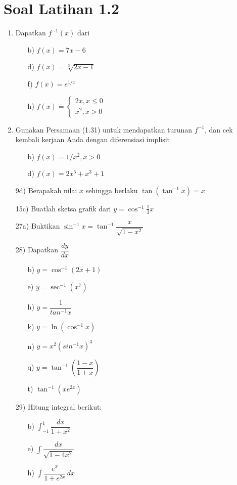 \documentclass{article}
\begin{document}
\section*{Soal Latihan 1.2}
\begin{enumerate}
	\item Dapatkan $f^{-1}(x)$ dari 
	\begin{enumerate}
		\item[b)] $f(x)=7x-6$
		\item[d)] $f(x)=\sqrt[3]{2x-1}$
		\item[f)] $f(x)=e^{1/x}$
		\item[h)] $f(x)=\begin{cases} 2x, x\leq 0\\
		x^2, x>0 \end{cases}$
	\end{enumerate}
	\item Gunakan Persamaan (1.31) untuk mendapatkan turunan $f^{-1}$, dan cek kembali kerjaan Anda dengan diferensiasi implisit
	\begin{enumerate}
		\item[b)] $f(x)=1/x^2,x>0$
		\item[d)] $f(x)=2x^5+x^3+1$
	\end{enumerate}
	\item[9d)] Berapakah nilai $x$ sehingga berlaku $\tan(\tan^{-1}x)=x$
	\item[15c)] Buatlah sketsa grafik dari $y=\cos^{-1} \frac{1}{3}x$
	\item[27a)] Buktikan $\sin^{-1}x=\tan^{-1} \dfrac{x}{\sqrt{1-x^2}}$
	\item[28)] Dapatkan $\dfrac{dy}{dx}$
	\begin{enumerate}
		\item[b)] $y=\cos^{-1}(2x+1)$
		\item[e)] $y=\sec^{-1}(x^7)$
		\item[h)] $y=\dfrac{1}{tan^{-1}x}$
		\item[k)] $y=\ln(\cos^{-1}x)$
		\item[n)] $y=x^2(sin^{-1}x)^3$
		\item[q)] $y=\tan^{-1}\left(\dfrac{1-x}{1+x}\right)$
		\item[t)] $\tan^{-1}(xe^{2x})$
	\end{enumerate}
	\item[29)] Hitung integral berikut:
	\begin{enumerate}
		\item[b)] $\displaystyle \int_{-1}^1\dfrac{dx}{1+x^2}$
		\item[e)] $\displaystyle \int \dfrac{dx}{\sqrt{1-4x^2}}$
		\item[h)] $\displaystyle \int \dfrac{e^x}{1+e^{2x}} \, dx$
	\end{enumerate}
\end{enumerate}
\newpage
\end{document}
